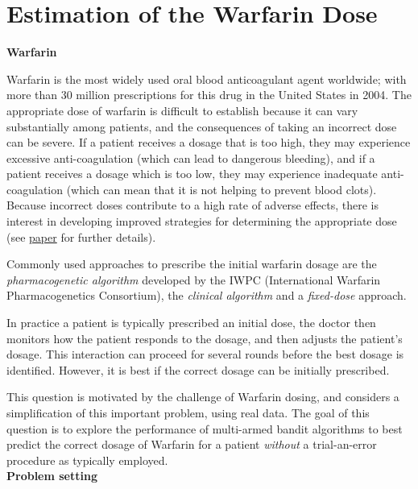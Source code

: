 \section{Estimation of the Warfarin Dose}

\textbf{Warfarin}

Warfarin is the most widely used oral blood anticoagulant agent worldwide;
with more than 30 million prescriptions for this drug in the United States in 2004.
The appropriate dose of warfarin is difficult to establish because it can vary substantially among patients,
and the consequences of taking an incorrect dose can be severe.  If a patient receives a dosage that is too high, they may experience excessive anti-coagulation (which can lead to dangerous bleeding), and if a patient receives a dosage which is too low, they may experience inadequate anti-coagulation (which can mean that it is not helping to prevent blood clots). Because incorrect doses contribute to a high rate of adverse effects, there is interest in developing improved strategies for determining the appropriate dose (see \href{https://www.nejm.org/doi/full/10.1056/nejmoa0809329}{paper} for further details).

\noindent Commonly used approaches to prescribe the initial warfarin dosage are the \textit{pharmacogenetic algorithm} developed by the IWPC (International Warfarin Pharmacogenetics Consortium), the \textit{clinical algorithm} and a \textit{fixed-dose} approach.

\noindent In practice a patient is typically prescribed an initial dose, the doctor then monitors how the patient responds to the dosage, and then adjusts the patient's dosage. This interaction can proceed for several rounds before the best dosage is identified. However, it is best if the correct dosage can be initially prescribed.

\noindent This question is motivated by the challenge of Warfarin dosing, and considers a simplification of this
important problem, using real data.  The goal of this question is to explore the performance of multi-armed bandit algorithms to best predict the correct dosage of Warfarin for a patient \emph{without} a trial-an-error procedure as typically employed. \\ %

\textbf{Problem setting}

